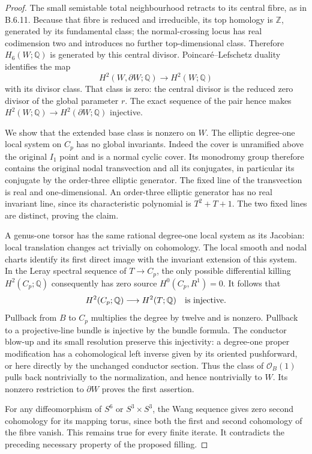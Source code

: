 \begin{proof}
The small semistable total neighbourhood retracts to its central
fibre, as in B.6.11.  Because that fibre is reduced and irreducible,
its top homology is $\mathbb Z$, generated by its fundamental class;
the normal-crossing locus has real codimension two and introduces
no further top-dimensional class.  Therefore $H_6(W;\mathbb Q)$
is generated by this central divisor.
Poincar\'e--Lefschetz duality identifies the map
\[
 H^2(W,\partial W;\mathbb Q)\longrightarrow H^2(W;\mathbb Q)
\]
with its divisor class.  That class is zero: the central divisor
is the reduced zero divisor of the global parameter $r$.
The exact sequence of the pair hence makes
$H^2(W;\mathbb Q)\to H^2(\partial W;\mathbb Q)$ injective.

We show that the extended base class is nonzero on $W$.
The elliptic degree-one local system on $C_p$ has no global
invariants.  Indeed the cover is unramified above the original
$I_1$ point and is a normal cyclic cover.  Its monodromy group
therefore contains the original nodal transvection and all its
conjugates, in particular its conjugate by the order-three
elliptic generator.  The fixed line of the transvection is real
and one-dimensional.  An order-three elliptic generator has no
real invariant line, since its characteristic polynomial is
$T^2+T+1$.  The two fixed lines are distinct, proving the claim.

A genus-one torsor has the same rational degree-one local system
as its Jacobian: local translation changes act trivially on
cohomology.  The local smooth and nodal charts identify its first
direct image with the invariant extension of this system.
In the Leray spectral sequence of $T\to C_p$, the only possible
differential killing $H^2(C_p;\mathbb Q)$ consequently has zero
source $H^0(C_p,R^1)=0$.  It follows that
\[
 H^2(C_p;\mathbb Q)\longrightarrow H^2(T;\mathbb Q)
 \quad\hbox{is injective}.
\]
Pullback from $B$ to $C_p$ multiplies the degree by twelve and is
nonzero.  Pullback to a projective-line bundle is injective by
the bundle formula.  The conductor blow-up and its small
resolution preserve this injectivity: a degree-one proper
modification has a cohomological left inverse given by its
oriented pushforward, or here directly by the unchanged
conductor section.  Thus the class of $\mathcal O_B(1)$ pulls
back nontrivially to the normalization, and hence nontrivially
to $W$.  Its nonzero restriction to $\partial W$ proves the
first assertion.

For any diffeomorphism of $S^6$ or $S^3\times S^3$, the Wang
sequence gives zero second cohomology for its mapping torus,
since both the first and second cohomology of the fibre vanish.
This remains true for every finite iterate.  It contradicts
the preceding necessary property of the proposed filling.


\end{proof}
